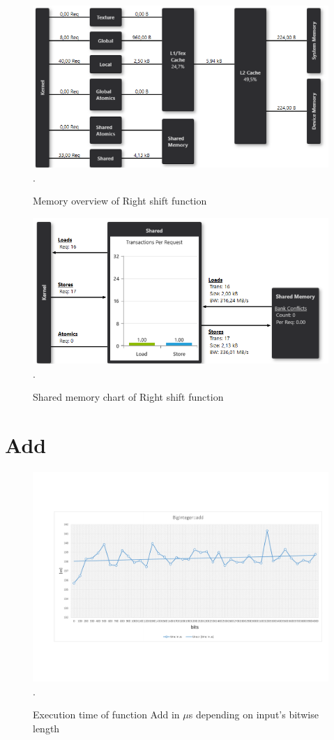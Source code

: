 \documentclass[oneside,openright,12pt,final,en]{mgr}
\begin{document}
\begin{figure}[H]
	\centering
	\includegraphics[width=\textwidth]{rightshift_memory}.
	\caption{Memory overview of Right shift function}
	\label{fig:rightshift_memory}
\end{figure}

\begin{figure}[H]
	\centering
	\includegraphics[width=\textwidth]{rightshift_shared}.
	\caption{Shared memory chart of Right shift function}
	\label{fig:rightshift_shared}
\end{figure}

\section{Add}

\begin{figure}[H]
	\centering
	\includegraphics[width=\textwidth,trim={0.5cm 2.8cm 0.4cm 2.8cm},clip]{add.pdf}.
	\caption{Execution time of function Add in $\mu$s depending on input's bitwise length}
	\label{fig:add}
\end{figure}
\end{document}
